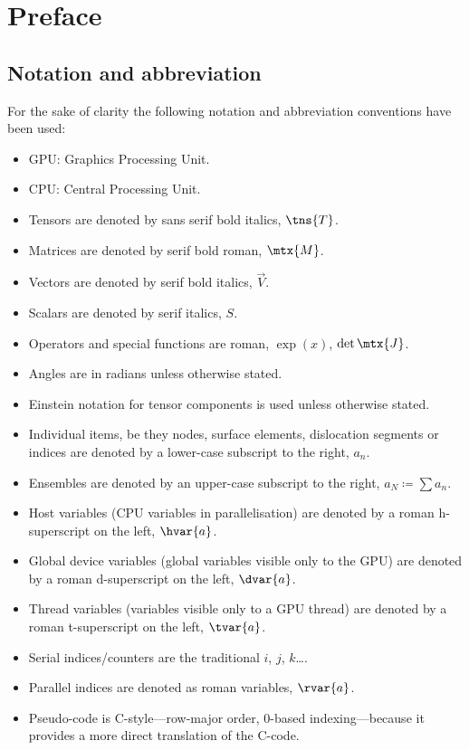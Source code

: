 \addtocounter{chapter}{-1}
\chapter{Preface}
\label{c:pre}

\section{Notation and abbreviation}
\label{s:nota}

For the sake of clarity the following notation and abbreviation conventions have been used:
\begin{itemize}
	\item GPU: Graphics Processing Unit.
	\item CPU: Central Processing Unit.
	\item Tensors are denoted by sans serif bold italics, $ \tns{T} $.
	\item Matrices are denoted by serif bold roman, $ \mtx{M} $.
	\item Vectors are denoted by serif bold italics, $ \vec{V} $.
	\item Scalars are denoted by serif italics, $ S $.
	\item Operators and special functions are roman, $\exp(x)$, $\det{\mtx{J}}$.
	\item Angles are in radians unless otherwise stated.
	\item Einstein notation for tensor components is used unless otherwise stated.
	\item Individual items, be they nodes, surface elements, dislocation segments or indices are denoted by a lower-case subscript to the right, $a_n$.
	\item Ensembles are denoted by an upper-case subscript to the right, $a_N \coloneqq \sum a_n$.
	\item Host variables (CPU variables in parallelisation) are denoted by a roman h-superscript on the left, $\hvar{a}$.
	\item Global device variables (global variables visible only to the GPU) are denoted by a roman d-superscript on the left, $\dvar{a}$.
	\item Thread variables (variables visible only to a GPU thread) are denoted by a roman t-superscript on the left, $\tvar{a}$.
	\item Serial indices/counters are the traditional $i$, $j$, $k$\ldots{}.
	\item Parallel indices are denoted as roman variables, $\rvar{a}$.
	\item Pseudo-code is C-style---row-major order, 0-based indexing---because it provides a more direct translation of the C-code.
\end{itemize}

